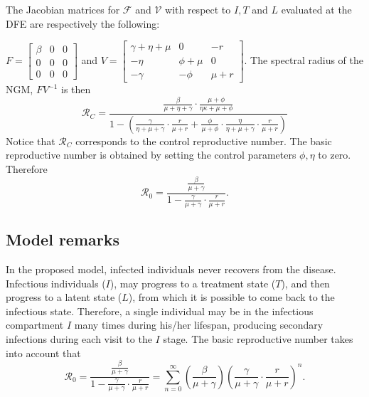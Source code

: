 \documentclass{book}\usepackage[]{graphicx}\usepackage[]{color}
\begin{document}
The Jacobian matrices for $\mathcal{F}$ and $\mathcal{V}$ with respect to $I, T$ and $L$ evaluated at the DFE are respectively the following:

\noindent $F=\left[\begin{array}{lll}\beta & 0 & 0 \\ 0 & 0 & 0 \\ 0 & 0 & 0\end{array}\right]$
and $V=\left[\begin{array}{ccc}\gamma+\eta+\mu & 0 & -r \\ -\eta & \phi+\mu & 0 \\ -\gamma & -\phi & \mu+r\end{array}\right]$.
%
The spectral radius of the NGM, $FV^{-1}$ is then
\begin{equation}
\mathcal{R}_C=\frac{\frac{\beta}{\mu+\eta+\gamma} \cdot \frac{\mu+\phi}{\eta \kappa+\mu+\phi}}{1-\left(\frac{\gamma}{\eta+\mu+\gamma} \cdot \frac{r}{\mu+r}+\frac{\phi}{\mu+\phi} \cdot \frac{\eta}{\eta+\mu+\gamma} \cdot \frac{r}{\mu+r}\right)}
\end{equation}
Notice that $\mathcal{R}_C$ corresponds to the control reproductive number. The basic reproductive number is obtained by setting the control parameters $\phi,\eta$ to zero. Therefore
\begin{equation} \label{eq:hsv2brn}
\mathcal{R}_0=\frac{\frac{\beta}{\mu+\gamma}}{1-\frac{\gamma}{\mu+\gamma} \cdot \frac{r}{\mu+r}}.
\end{equation}


\subsection*{Model remarks}
In the proposed model, infected individuals never recovers from the disease. Infectious individuals ($I$), may progress to a treatment state ($T$), and then progress to a latent state ($L$), from which it is possible to come back to the infectious state. Therefore, a single individual may be in the infectious compartment $I$ many times during his/her lifespan, producing secondary infections during each visit to the $I$ stage.
%
The basic reproductive number takes into account that 
\begin{equation} \label{eq:hsv2brnsrs}
\mathcal{R}_0=\frac{\frac{\beta}{\mu+\gamma}}{1-\frac{\gamma}{\mu+\gamma} \cdot \frac{r}{\mu+r}}=\sum_{n=0}^{\infty}\left(\frac{\beta}{\mu+\gamma}\right)\left(\frac{\gamma}{\mu+\gamma} \cdot \frac{r}{\mu+r}\right)^{n}.
\end{equation}
\end{document}
